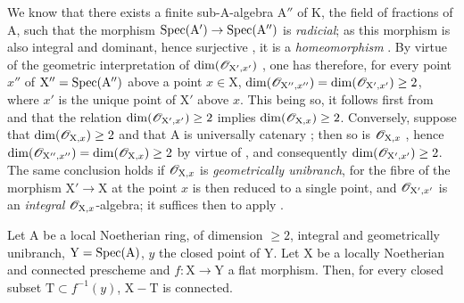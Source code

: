 \begin{remark}[18.9.7.6]
\label{IV.18.9.7.6}
We know  that there exists a finite sub-A-algebra $\mathrm{A}''$ of K, the field of fractions of A, such that the morphism $\operatorname{Spec}(\mathrm{A}')\to\operatorname{Spec}(\mathrm{A}'')$ is \emph{radicial};
as this morphism is also integral and dominant, hence surjective , it is a \emph{homeomorphism} .
By virtue of the geometric interpretation of $\dim(\mathscr{O}_{\mathrm{X}',x'})$ , one has therefore, for every point $x''$ of $\mathrm{X}''=\operatorname{Spec}(\mathrm{A}'')$ above a point $x\in\mathrm{X}$, $\dim(\mathscr{O}_{\mathrm{X}'',x''})=\dim(\mathscr{O}_{\mathrm{X}',x'})\geq 2$, where $x'$ is the unique point of $\mathrm{X}'$ above $x$.
This being so, it follows first from  and  that the relation $\dim(\mathscr{O}_{\mathrm{X}',x'})\geq 2$ implies $\dim(\mathscr{O}_{\mathrm{X},x})\geq 2$.
Conversely, suppose that $\dim(\mathscr{O}_{\mathrm{X},x})\geq 2$ and that A is universally catenary ; then so is $\mathscr{O}_{\mathrm{X},x}$ , hence $\dim(\mathscr{O}_{\mathrm{X}'',x''})=\dim(\mathscr{O}_{\mathrm{X},x})\geq 2$ by virtue of , and consequently $\dim(\mathscr{O}_{\mathrm{X}',x'})\geq 2$.
The same conclusion holds if $\mathscr{O}_{\mathrm{X},x}$ is \emph{geometrically unibranch}, for the fibre of the morphism $\mathrm{X}'\to\mathrm{X}$ at the point $x$ is then reduced to a single point, and $\mathscr{O}_{\mathrm{X}',x'}$ is an \emph{integral} $\mathscr{O}_{\mathrm{X},x}$-algebra;
it suffices then to apply .
\end{remark}

\begin{lemma}[18.9.7.7]
\label{IV.18.9.7.7}
Let $\mathrm{A}$ be a local Noetherian ring, of dimension $\geq 2$, integral and geometrically unibranch, $\mathrm{Y}=\operatorname{Spec}(\mathrm{A})$, $y$ the closed point of Y.
Let $\mathrm{X}$ be a locally Noetherian and connected prescheme and $f:\mathrm{X}\to\mathrm{Y}$ a flat morphism.
Then, for every closed subset $\mathrm{T}\subset f^{-1}(y)$, $\mathrm{X}-\mathrm{T}$ is connected.
\end{lemma}

